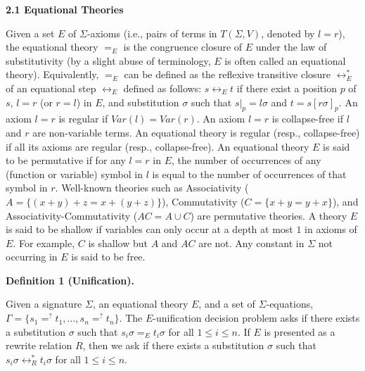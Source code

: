  
 
\par\medskip\noindent\textbf{2.1 Equational Theories}\par
 
 
Given a set $E$ of $\Sigma$-axioms (i.e., pairs of terms in $T(\Sigma,V)$, denoted by $l=r$), the equational theory $=_{E}$ is the congruence closure of $E$ under the law of substitutivity (by a slight abuse of terminology, $E$ is often called an equational theory). Equivalently, $=_{E}$ can be defined as the reflexive transitive closure $\leftrightarrow_{E}^{*}$ of an equational step $\leftrightarrow_{E}$ defined as follows: $s\leftrightarrow_{E}t$ if there exist a position $p$ of $s$, $l=r$ (or $r=l$) in $E$, and substitution $\sigma$ such that $s|_{p}=l\sigma$ and $t=s[r\sigma]_{p}$. An axiom $l=r$ is regular if $\mathit{Var}(l)=\mathit{Var}(r)$. An axiom $l=r$ is collapse-free if $l$ and $r$ are non-variable terms. An equational theory is regular (resp., collapse-free) if all its axioms are regular (resp., collapse-free). An equational theory $E$ is said to be permutative if for any $l=r$ in $E$, the number of occurrences of any (function or variable) symbol in $l$ is equal to the number of occurrences of that symbol in $r$. Well-known theories such as Associativity ($A=\{(x+y)+z=x+(y+z)\}$), Commutativity ($C=\{x+y=y+x\}$), and Associativity-Commutativity ($AC=A\cup C$) are permutative theories. A theory $E$ is said to be shallow if variables can only occur at a depth at most $1$ in axioms of $E$. For example, $C$ is shallow but $A$ and $AC$ are not. Any constant in $\Sigma$ not occurring in $E$ is said to be free.\par
 
 
 
\par\medskip\noindent\textbf{Definition 1 (Unification).}\par
 
 
Given a signature $\Sigma$, an equational theory $E$, and a set of $\Sigma$-equations, $\Gamma=\{s_{1}=^{?}t_{1},\dots,s_{n}=^{?}t_{n}\}$. The $E$-unification decision problem asks if there exists a substitution $\sigma$ such that $s_{i}\sigma=_{E}t_{i}\sigma$ for all $1\leq i\leq n$. If $E$ is presented as a rewrite relation $R$, then we ask if there exists a substitution $\sigma$ such that $s_{i}\sigma\leftrightarrow_{R}^{*}t_{i}\sigma$ for all $1\leq i\leq n$.\par
 
